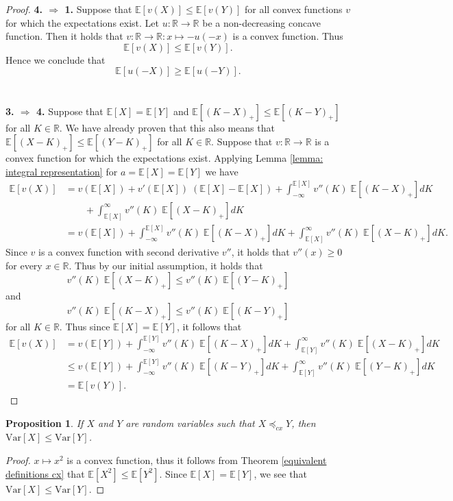 \documentclass{article}
\newtheorem{proposition}{Proposition}
\begin{document}
\begin{proof}
\textbf{4. $\Rightarrow$ 1.} Suppose that $\mathbb{E}[v(X)] \leq \mathbb{E}[v(Y)]$ for all convex functions $v$ for which the expectations exist. Let $u: \mathbb{R}\rightarrow \mathbb{R}$ be a non-decreasing concave function. Then it holds that $v:\mathbb{R}\rightarrow\mathbb{R}: x\mapsto -u(-x)$ is a convex function. Thus 
$$\mathbb{E}[v(X)]\leq \mathbb{E}[v(Y)].$$
Hence we conclude that
$$\mathbb{E}[u(-X)]\geq \mathbb{E}[u(-Y)].$$
\\\\
\textbf{3. $\Rightarrow$ 4.} Suppose that $\mathbb{E}[X] = \mathbb{E}[Y]$ and $\mathbb{E}[(K-X)_+] \leq \mathbb{E}[(K-Y)_+]$ for all $K\in \mathbb{R}$. We have already proven that this also means that $\mathbb{E}[(X-K)_+] \leq \mathbb{E}[(Y-K)_+]$ for all $K\in \mathbb{R}$. Suppose that $v:\mathbb{R}\rightarrow \mathbb{R}$ is a convex function for which the expectations exist. Applying Lemma \ref{lemma: integral representation} for $a = \mathbb{E}[X] = \mathbb{E}[Y]$ we have
\begin{align*}
\mathbb{E}[v(X)] &= v(\mathbb{E}[X]) + v'(\mathbb{E}[X])\;(\mathbb{E}[X] - \mathbb{E}[X]) + \int_{-\infty}^{\mathbb{E}[X]}v''(K)\;\mathbb{E}[(K-X)_+]dK \\
&\quad\quad+ \int^{\infty}_{\mathbb{E}[X]}v''(K)\;\mathbb{E}[(X-K)_+]dK\\
&= v(\mathbb{E}[X])+ \int_{-\infty}^{\mathbb{E}[X]}v''(K)\;\mathbb{E}[(K-X)_+]dK + \int^{\infty}_{\mathbb{E}[X]}v''(K)\;\mathbb{E}[(X-K)_+]dK.
\end{align*}
Since $v$ is a convex function with second derivative $v''$, it holds that $v''(x) \geq 0$ for every $x\in \mathbb{R}$. Thus by our initial assumption, it holds that 
$$v''(K)\;\mathbb{E}[(X-K)_+] \leq v''(K)\;\mathbb{E}[(Y-K)_+]$$
and 
$$v''(K)\;\mathbb{E}[(K-X)_+] \leq v''(K)\;\mathbb{E}[(K-Y)_+]$$
for all $K\in \mathbb{R}$. Thus since $\mathbb{E}[X] = \mathbb{E}[Y]$, it follows that
\begin{align*}
    \mathbb{E}[v(X)] &= v(\mathbb{E}[Y])+ \int_{-\infty}^{\mathbb{E}[Y]}v''(K)\;\mathbb{E}[(K-X)_+]dK + \int^{\infty}_{\mathbb{E}[Y]}v''(K)\;\mathbb{E}[(X-K)_+]dK\\
    &\leq v(\mathbb{E}[Y])+ \int_{-\infty}^{\mathbb{E}[Y]}v''(K)\;\mathbb{E}[(K-Y)_+]dK + \int^{\infty}_{\mathbb{E}[Y]}v''(K)\;\mathbb{E}[(Y-K)_+]dK\\
    &= \mathbb{E}[v(Y)].
\end{align*}
\end{proof}

\begin{proposition}\label{prop: inequality of variances convex order}
    If $X$ and $Y$ are random variables such that $X\preceq_{cx} Y$, then $\text{Var}[X]\leq \text{Var}[Y]$.
\end{proposition}
\begin{proof}
    $x\mapsto x^2$ is a convex function, thus it follows from Theorem \ref{equivalent definitions cx} that $\mathbb{E}[X^2] \leq \mathbb{E}[Y^2]$. Since $\mathbb{E}[X] = \mathbb{E}[Y]$, we see that $\text{Var}[X]\leq \text{Var}[Y]$.
\end{proof}
\end{document}

